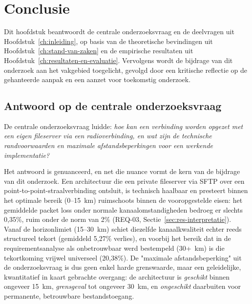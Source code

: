 
\chapter{Conclusie}%
\label{ch:conclusie}


Dit hoofdstuk beantwoordt de centrale onderzoeksvraag en de deelvragen uit
Hoofdstuk~\ref{ch:inleiding}, op basis van de theoretische bevindingen uit
Hoofdstuk~\ref{ch:stand-van-zaken} en de empirische resultaten uit
Hoofdstuk~\ref{ch:resultaten-en-evaluatie}. Vervolgens wordt de bijdrage van dit
onderzoek aan het vakgebied toegelicht, gevolgd door een kritische reflectie op de
gehanteerde aanpak en een aanzet voor toekomstig onderzoek.
 
\section{Antwoord op de centrale onderzoeksvraag}%
\label{sec:conclusie-hoofdvraag}
 
De centrale onderzoeksvraag luidde: \textit{hoe kan een verbinding worden opgezet met
een eigen fileserver via een radioverbinding, en wat zijn de technische randvoorwaarden
en maximale afstandsbeperkingen voor een werkende implementatie?}
 
Het antwoord is genuanceerd, en net die nuance vormt de kern van de bijdrage van dit
onderzoek. Een architectuur die een private fileserver via SFTP over een
point-to-point-straalverbinding ontsluit, is technisch haalbaar en presteert binnen het
optimale bereik (0--15~km) ruimschoots binnen de vooropgestelde eisen: het gemiddelde
packet loss onder normale kanaalomstandigheden bedroeg er slechts 0{,}35\%, ruim onder
de norm van 2\% (REQ-03, Sectie~\ref{sec:res-interpretatie}). Vanaf de horizonlimiet
(15--30~km) schiet diezelfde kanaalkwaliteit echter reeds structureel tekort (gemiddeld
5{,}27\% verlies), en voorbij het bereik dat in de requirementsanalyse als onbetrouwbaar
werd bestempeld (30+~km) is die tekortkoming vrijwel universeel (20{,}38\%). De
"maximale afstandsbeperking" uit de onderzoeksvraag is dus geen enkel harde grenswaarde,
maar een geleidelijke, kwantitatief in kaart gebrachte overgang: de architectuur is
\emph{geschikt} binnen ongeveer 15~km, \emph{grensgeval} tot ongeveer 30~km, en
\emph{ongeschikt} daarbuiten voor permanente, betrouwbare bestandstoegang.
 
